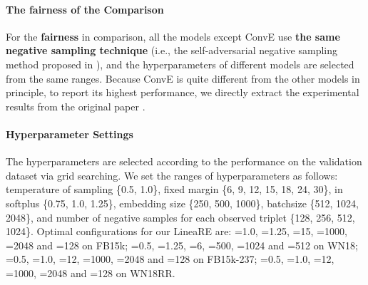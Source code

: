 \documentclass[conference]{IEEEtran}
\begin{document}
\paragraph*{The fairness of the Comparison}
For the \textbf{fairness} in comparison, all the models except ConvE use \textbf{the same negative sampling technique} (i.e., the self-adversarial negative sampling method proposed in \cite{RotatE}), and the hyperparameters of different models are selected from the same ranges. Because ConvE is quite different from the other models in principle, to report its highest performance, we directly extract the experimental results from the original paper \cite{ConvE}.

\paragraph*{Hyperparameter Settings}
The hyperparameters are selected according to the performance on the validation dataset via grid searching. We set the ranges of hyperparameters as follows: temperature of sampling  \{0.5, 1.0\}, fixed margin  \{6, 9, 12, 15, 18, 24, 30\},  in softplus  \{0.75, 1.0, 1.25\}, embedding size  \{250, 500, 1000\}, batchsize  \{512, 1024, 2048\}, and number of negative samples for each observed triplet  \{128, 256, 512, 1024\}. Optimal configurations for our LineaRE are: =1.0, =1.25, =15, =1000, =2048 and =128 on FB15k; =0.5, =1.25, =6, =500, =1024 and =512 on WN18; =0.5, =1.0, =12, =1000, =2048 and =128 on FB15k-237; =0.5, =1.0, =12, =1000, =2048 and =128 on WN18RR.
\end{document}
